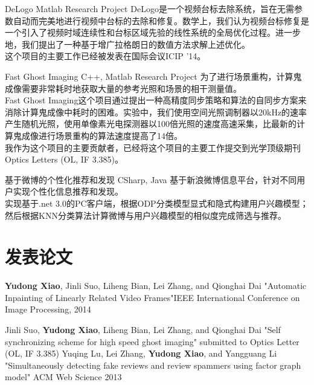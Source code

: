 \documentclass[11pt,a4paper]{moderncv}
\begin{document}
\vspace*{0.2\baselineskip}
{DeLogo}
{Matlab}
{Research Project}{}
{
	DeLogo是一个视频台标去除系统，旨在无需参数自动而完美地进行视频中台标的去除和修复。数学上，我们认为视频台标修复是一个引入了视频时域连续性和台标区域先验的线性系统的全局优化过程。进一步地，我们提出了一种基于增广拉格朗日的数值方法求解上述优化。\\
	这个项目的主要工作已经被发表在国际会议ICIP '14。
}

\vspace*{0.2\baselineskip}
{Fast Ghost Imaging}
{C++, Matlab}
{Research Project}{}
{
	为了进行场景重构，计算鬼成像需要非常耗时地获取大量的参考光照和场景的相干测量值。\\
	Fast Ghost Imaging这个项目通过提出一种高精度同步策略和算法的自同步方案来消除计算鬼成像中耗时的困难。实验中，我们使用空间光照调制器以20kHz的速率产生随机光照，使用单像素光电探测器以100倍光照的速度高速采集，比最新的计算鬼成像进行场景重构的算法速度提高了14倍。\\
	我作为这个项目的主要贡献者，已经将这个项目的主要工作提交到光学顶级期刊Optics Letters (OL, IF 3.385)。
}

\vspace*{0.2\baselineskip}
{基于微博的个性化推荐和发现}
{CSharp, Java}
{}{}
{
	基于新浪微博信息平台，针对不同用户实现个性化信息推荐和发现。\\
	实现基于.net 3.0的PC客户端，根据ODP分类模型显式和隐式构建用户兴趣模型；然后根据KNN分类算法计算微博与用户兴趣模型的相似度完成筛选与推荐。
}

\renewcommand{\baselinestretch}{1.0}

\section{发表论文}
{\textbf{Yudong Xiao}\textnormal{, Jinli Suo, Liheng Bian, Lei Zhang, and Qionghai Dai}}
{"Automatic Inpainting of Linearly Related Video Frames"}{IEEE International Conference on Image Processing, 2014}
{}{}{}

{\textnormal{Jinli Suo, }\textbf{Yudong Xiao}\textnormal{, Liheng Bian, Lei Zhang, and Qionghai Dai}}
{"Self synchronizing scheme for high speed ghost imaging"}
{submitted to Optics Letter (OL, IF 3.385)}
{}{}{}
{\textnormal{Yuqing Lu, Lei Zhang, }\textbf{Yudong Xiao}\textnormal{, and Yangguang Li}}
{"Simultaneously detecting fake reviews and review spammers using factor graph model"}
{ACM Web Science 2013}
{}{}{}
\end{document}
